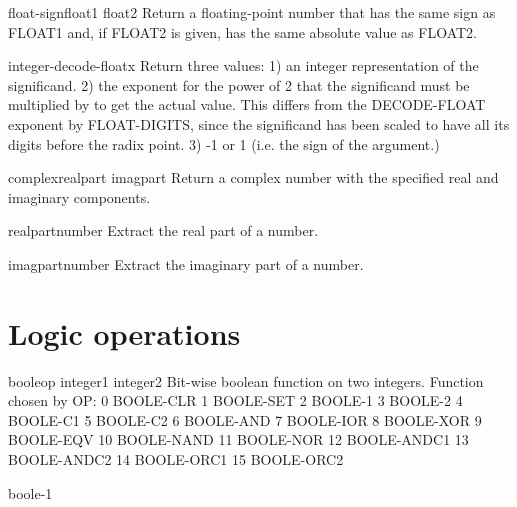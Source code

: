 \begin{function}{float-sign}{float1 \op float2}{}{}
  Return a floating-point number that has the same sign as
   FLOAT1 and, if FLOAT2 is given, has the same absolute value
   as FLOAT2.
\end{function}

\begin{function}{integer-decode-float}{x}{}{}
  Return three values:
   1) an integer representation of the significand.
   2) the exponent for the power of 2 that the significand must be multiplied
      by to get the actual value. This differs from the DECODE-FLOAT exponent
      by FLOAT-DIGITS, since the significand has been scaled to have all its
      digits before the radix point.
   3) -1 or 1 (i.e. the sign of the argument.)
\end{function}

\begin{function}{complex}{realpart \op imagpart}{}{}
  Return a complex number with the specified real and imaginary components.
\end{function}

\begin{function}{realpart}{number}{}{}
  Extract the real part of a number.
\end{function}

\begin{function}{imagpart}{number}{}{}
  Extract the imaginary part of a number.
\end{function}

\section{Logic operations}
\label{sec:logic-operations}

\begin{function}{boole}{op integer1 integer2}{}{}
  Bit-wise boolean function on two integers. Function chosen by OP:
        0       BOOLE-CLR
        1       BOOLE-SET
        2       BOOLE-1
        3       BOOLE-2
        4       BOOLE-C1
        5       BOOLE-C2
        6       BOOLE-AND
        7       BOOLE-IOR
        8       BOOLE-XOR
        9       BOOLE-EQV
        10      BOOLE-NAND
        11      BOOLE-NOR
        12      BOOLE-ANDC1
        13      BOOLE-ANDC2
        14      BOOLE-ORC1
        15      BOOLE-ORC2
\end{function}

\begin{constant}{boole-1}{}{}{}
  
\end{constant}

